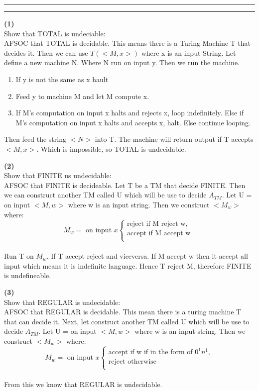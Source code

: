 \documentclass[a4paper, 11pt]{article}
\newcommand{\question}[2] {\vspace{.25in} \hrule\vspace{0.5em}
\noindent{\bf #1: #2} \vspace{0.5em}
\hrule \vspace{.10in}}
\renewcommand{\part}[1] {\vspace{.10in} {\bf (#1)}}
\begin{document}
\question{4}{Undecidability}
\part{1}\\
Show that TOTAL is undeciable:\\
AFSOC that TOTAL is decidable. This means there is a Turing Machine T that decides it. 
Then we can use $T(<M,x>)$ where x is an input String. Let define a new machine N. Where N run on input y. Then we run the machine.\\
\begin{enumerate}
	\item If y is not the same as x hault
	\item Feed y to machine M and let M compute x.
	\item If M's computation on input x halts and rejects x, loop indefinitely. Else if M's computation on input x halts and accepts x, halt. Else continue looping.
\end{enumerate}
Then feed the string $<N>$ into T. The machine will return output if T accepts $<M, x>$. Which is impossible, so TOTAL is undecidable.

\part{2}\\
Show that FINITE us undecidable:\\
AFSOC that FINITE is decideable. Let T be a TM that decide FINITE. Then we can construct another TM called U which will be use to decide $A_{TM}$. Let U = on input $<M,w>$ where w is an input string. Then we construct $<M_w>$ where:\\
\[
\text{$M_w = $ on input $x$}
\left\{
\begin{matrix}
\text{reject if M reject w},\\ \text{accept if M accept w }\\
\end{matrix}
\right.
\]\\
Run T on $M_w$. If T accept reject and viceversa. If M accept w then it accept all input which means it is indefinite language. Hence T reject M, therefore FINITE is undefineable.

\part{3}\\
Show that REGULAR is undecidable:\\
AFSOC that REGULAR is decidable. This mean there is a turing machine T that can decide it. Next, let construct another TM called U which will be use to decide $A_{TM}$. Let U = on input $<M,w>$ where w is an input string. Then we construct $<M_w>$ where:\\
\[
\text{$M_w = $ on input $x$}
\left\{
\begin{matrix}
\text{accept if w if in the form of } 0^1n^1,\\ \text{reject otherwise }\\
\end{matrix}
\right.
\]\\
From this we know that REGULAR is undecidable.
\end{document}

